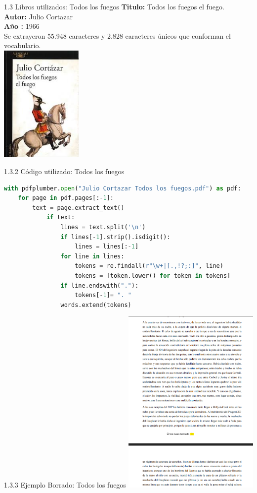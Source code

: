 \documentclass{beamer}
\begin{document}
	

\begin{frame}{1.3 Libros utilizados: Todos los fuegos}
\justifying
\textbf{Titulo:} Todos los fuegos el fuego.\\
\textbf{Autor:} Julio Cortazar\\
\textbf{Año :} 1966\\
Se extrayeron 55.948 caracteres y 2.828 caracteres únicos que conforman el vocabulario.\\
\centering
\vspace{0.2cm}
\includegraphics[width=0.3\textwidth]{todos_los_fuegos_cortazar}

\end{frame}

\begin{frame}[fragile]{1.3.2 Código utilizado: Todos los fuegos}
\begin{lstlisting}[language=Python]
with pdfplumber.open("Julio Cortazar Todos los fuegos.pdf") as pdf:
	for page in pdf.pages[:-1]:
		text = page.extract_text()
			if text:
				lines = text.split('\n')
				if lines[-1].strip().isdigit():
					lines = lines[:-1]
				for line in lines:
					tokens = re.findall(r"\w+|[.,!?;:]", line)
					tokens = [token.lower() for token in tokens]
				if line.endswith("."):
					tokens[-1]= ". "
				words.extend(tokens)
		\end{lstlisting}

\end{frame}


\begin{frame}{1.3.3 Ejemplo Borrado: Todos los fuegos}
\centering
\includegraphics[width=0.5\textwidth]{borrado_todoslosfuegos}

\end{frame}	
	
\end{document}
